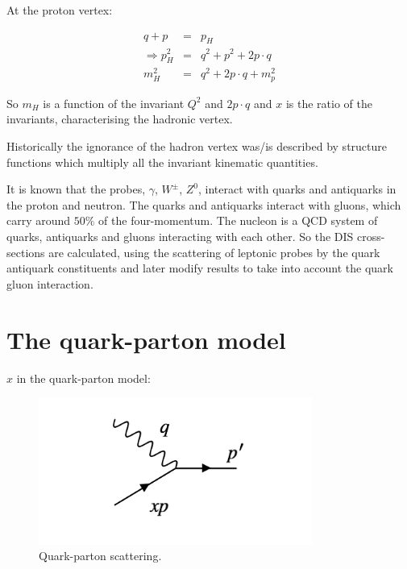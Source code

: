 At the proton vertex:

\begin{eqnarray*}
  q + p & = & p_H \\
  \Rightarrow p_H^2 & = & q^2 + p^2 + 2p \cdot q \\
  m_H^2 & = & q^2 + 2p \cdot q + m_p^2
\end{eqnarray*}

So $m_H$ is a function of the invariant $Q^2$ and $2p \cdot q$ and $x$ is the ratio of the invariants, characterising the hadronic vertex.

Historically the ignorance of the hadron vertex was/is described by structure functions which multiply all the invariant kinematic quantities.

It is known that the probes, $\gamma$, $W^{\pm}$, $Z^0$, interact with quarks and antiquarks in the proton and neutron.  The quarks and antiquarks interact with gluons, which carry around $50\%$ of the four-momentum.  The nucleon is a QCD system of quarks, antiquarks and gluons interacting with each other.  So the DIS cross-sections are calculated, using the scattering of leptonic probes by the quark antiquark constituents and later modify results to take into account the quark gluon interaction.

\section{The quark-parton model}

$x$ in the quark-parton model:

\begin{figure}[!htb]
  \begin{center}
    \includegraphics[width=0.8\textwidth]{images/web_feynman/image_61.png}
    \caption[Quark-parton scattering]{Quark-parton scattering.}
    \label{fig:ch14_quarkPartonScattering}
  \end{center}
\end{figure}

